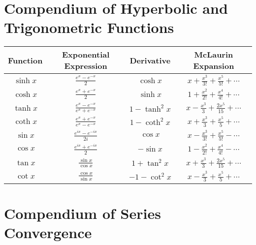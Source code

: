 \documentclass{article}
\begin{document}
\newpage



\section{Compendium of Hyperbolic and Trigonometric Functions}

\begin{center}
    \begin{tabular}{|c|c|c|c|}
        \hline
        \textbf{Function} & \textbf{Exponential Expression}     & \textbf{Derivative} & \textbf{McLaurin Expansion}                    \\
        \hline
        $\sinh{x}$        & $\frac{e^x - e^{-x}}{2}$            & $\cosh{x}$          & $x + \frac{x^3}{3!} + \frac{x^5}{5!} + \cdots$ \\
        \hline
        $\cosh{x}$        & $\frac{e^x + e^{-x}}{2}$            & $\sinh{x}$          & $1 + \frac{x^2}{2!} + \frac{x^4}{4!} + \cdots$ \\
        \hline
        $\tanh{x}$        & $\frac{e^x - e^{-x}}{e^x + e^{-x}}$ & $1 - \tanh^2{x}$    & $x - \frac{x^3}{3} + \frac{2x^5}{15} + \cdots$ \\
        \hline
        $\coth{x}$        & $\frac{e^x + e^{-x}}{e^x - e^{-x}}$ & $1 - \coth^2{x}$    & $x + \frac{x^3}{3} + \frac{x^5}{5} + \cdots$   \\
        \hline
        $\sin{x}$         & $\frac{e^{ix} - e^{-ix}}{2i}$       & $\cos{x}$           & $x - \frac{x^3}{3!} + \frac{x^5}{5!} - \cdots$ \\
        \hline
        $\cos{x}$         & $\frac{e^{ix} + e^{-ix}}{2}$        & $-\sin{x}$          & $1 - \frac{x^2}{2!} + \frac{x^4}{4!} - \cdots$ \\
        \hline
        $\tan{x}$         & $\frac{\sin{x}}{\cos{x}}$           & $1 + \tan^2{x}$     & $x + \frac{x^3}{3} + \frac{2x^5}{15} + \cdots$ \\
        \hline
        $\cot{x}$         & $\frac{\cos{x}}{\sin{x}}$           & $-1 - \cot^2{x}$    & $x - \frac{x^3}{3} + \frac{x^5}{5} + \cdots$   \\
        \hline
    \end{tabular}
\end{center}

\newpage

\section{Compendium of Series Convergence}
\end{document}
